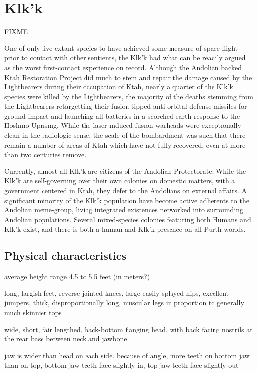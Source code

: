 \section{Klk'k}
FIXME 

 
One of only five extant species to have achieved some measure of
space-flight prior to contact with other sentients, the Klk'k had what
can be readily argued as the worst first-contact experience on
record. Although the Andolian backed Ktah Restoration Project did much
to stem and repair the damage caused by the Lightbearers during their
occupation of Ktah, nearly a quarter of the Klk'k species were killed
by the Lightbearers, the majority of the deaths stemming from the
Lightbearers retargetting their fusion-tipped anti-orbital defense
missiles for ground impact and launching all batteries in a
scorched-earth response to the Hoshino Uprising. While the
laser-induced fusion warheads were exceptionally clean in the
radiologic sense, the scale of the bombardment was such that there
remain a number of areas of Ktah which have not fully recovered, even
at more than two centuries remove.

Currently, almost all Klk'k are citizens of the Andolian
Protectorate. While the Klk'k are self-governing over their own
colonies on domestic matters, with a government centered in Ktah, they
defer to the Andolians on external affairs. A significant minority of
the Klk'k population have become active adherents to the Andolian
meme-group, living integrated existences networked into surrounding
Andolian populations. Several mixed-species colonies featuring both
Humans and Klk'k exist, and there is both a human and Klk'k presence
on all Purth worlds.


\subsection{Physical characteristics}
average height range 4.5 to 5.5 feet (in meters?)

long, largish feet, reverse jointed knees, large easily splayed hips,
excellent jumpers, thick, disproportionally long, muscular legs in
proportion to generally much skinnier tops

wide, short, fair lengthed, back-bottom flanging head, with back
facing nostrils at the rear base between neck and jawbone

jaw is wider than head on each side. because of angle, more teeth on
bottom jaw than on top, bottom jaw teeth face slightly in, top jaw
teeth face slightly out

